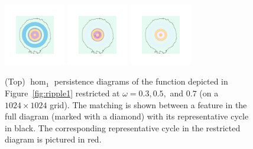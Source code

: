 \begin{figure}[htbp]
  \includegraphics[trim=500 500 500 500, clip, width=0.24\textwidth]{scripts/figures/matching2/surf_top-1_0.png}
  \includegraphics[trim=500 500 500 500, clip, width=0.24\textwidth]{scripts/figures/matching2/surf_top-1_1.png}
  \includegraphics[trim=500 500 500 500, clip, width=0.24\textwidth]{scripts/figures/matching2/surf_top-1_2.png}
  \caption{(Top) $\hom_1$ persistence diagrams of the function depicted in Figure~\ref{fig:ripple1} restricted at $\omega = 0.3, 0.5,$ and $0.7$ (on a $1024\times 1024$ grid).
          The matching is shown between a feature in the full diagram (marked with a diamond) with its representative cycle in black.
          The corresponding representative cycle in the restricted diagram is pictured in red.}
\end{figure}
